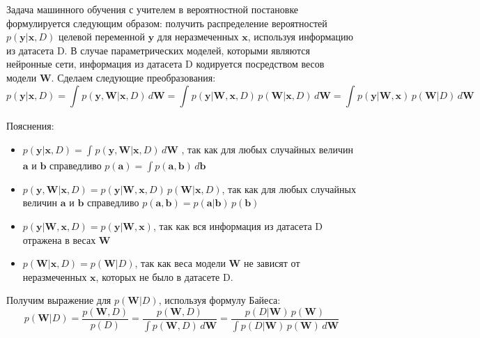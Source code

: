 \documentclass{article}
\begin{document}
    Задача машинного обучения с учителем
    в вероятностной постановке формулируется следующим образом: получить
    распределение вероятностей $p(\pmb{y} | \pmb{x}, D)$
    целевой переменной $\pmb{y}$
    для неразмеченных $\pmb{x}$, используя информацию из датасета D.
    В случае параметрических моделей, которыми являются нейронные сети,
    информация из датасета D кодируется посредством весов модели $\pmb{W}$.
    Сделаем следующие преобразования:
    \[
        p(\pmb{y} | \pmb{x}, D)
        =
        \int_{}{
            p(\pmb{y}, \pmb{W} | \pmb{x}, D)
            \,
            d\pmb{W}
        }
        =
        \int_{}{
            p(\pmb{y} | \pmb{W}, \pmb{x}, D)
            \,
            p(\pmb{W} | \pmb{x}, D)
            \,
            d\pmb{W}
        }
        =
        \int_{}{
            p(\pmb{y} | \pmb{W}, \pmb{x})
            \,
            p(\pmb{W} | D)
            \,
            d\pmb{W}
        }
    \]

    Пояснения:
    \begin{itemize}
    \item
        $
            p(\pmb{y} | \pmb{x}, D)
            =
            \int_{}{
                p(\pmb{y}, \pmb{W} | \pmb{x}, D)
                \,
                d\pmb{W}
            }
        $
        , так как для любых случайных величин
        $\pmb{a}$ и $\pmb{b}$ справедливо
        $
            p(\pmb{a})
            =
            \int{
                p(\pmb{a}, \pmb{b})
                \,
                d\pmb{b}
            }
        $
    \item
        $
            p(\pmb{y}, \pmb{W} | \pmb{x}, D)
            =
            p(\pmb{y} | \pmb{W}, \pmb{x}, D)
            \,
            p(\pmb{W} | \pmb{x}, D)
        $, так как для любых случайных величин $\pmb{a}$ и $\pmb{b}$ справедливо
        $
            p(\pmb{a}, \pmb{b})
            =
            p(\pmb{a}| \pmb{b})
            \,
            p(\pmb{b})
        $
    \item
        $
            p(\pmb{y} | \pmb{W}, \pmb{x}, D)
            =
            p(\pmb{y} | \pmb{W}, \pmb{x})
        $, так как вся информация из датасета D отражена в весах $\pmb{W}$
    \item
        $
            p(\pmb{W} | \pmb{x}, D)
            =
            p(\pmb{W} | D)
        $, так как веса модели $\pmb{W}$ не зависят от неразмеченных
        $\pmb{x}$, которых не было в датасете D.
    \end{itemize}

    Получим выражение для $p(\pmb{W}| D)$, используя формулу Байеса:
    \[
        p(\pmb{W}| D)
        =
        \frac
            {p(\pmb{W}, D)}
            {p(D)}
        =
        \frac
            {p(\pmb{W}, D)}
            {
                \int{
                    p(\pmb{W}, D)
                    \,
                    d\pmb{W}
                }
            }
        =
        \frac
            {
                p(D | \pmb{W})
                \,
                p(\pmb{W})
            }
            {
                \int{
                    p(D | \pmb{W})
                    \,
                    p(\pmb{W})
                    \,
                    d\pmb{W}
                }
            }
    \]
\end{document}
